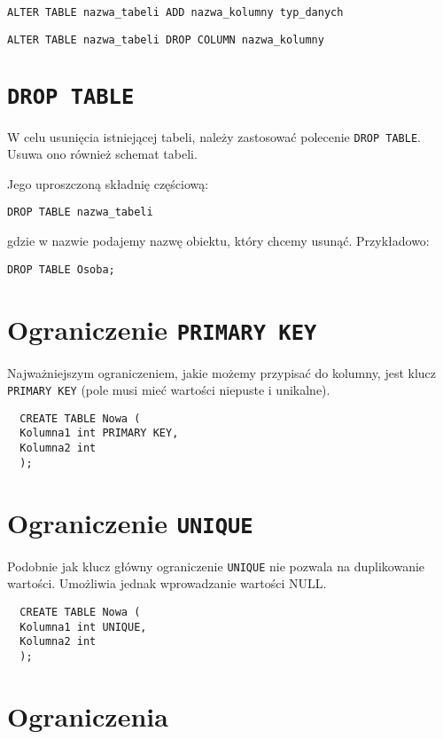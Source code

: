 \documentclass{article}
\begin{document}
\begin{verbatim}
ALTER TABLE nazwa_tabeli ADD nazwa_kolumny typ_danych
\end{verbatim}

\begin{verbatim}
ALTER TABLE nazwa_tabeli DROP COLUMN nazwa_kolumny
\end{verbatim}

\section{\tt DROP TABLE}

W celu usunięcia istniejącej tabeli, należy zastosować polecenie {\tt DROP TABLE}. Usuwa ono również schemat tabeli.

Jego uproszczoną składnię częściową:
\begin{verbatim}
DROP TABLE nazwa_tabeli
\end{verbatim}
gdzie w nazwie podajemy nazwę obiektu, który chcemy usunąć. Przykładowo:
\begin{verbatim}
DROP TABLE Osoba;
\end{verbatim}

\section{Ograniczenie {\tt PRIMARY KEY}}

Najważniejszym ograniczeniem, jakie możemy przypisać do kolumny, jest klucz {\tt PRIMARY KEY} (pole musi mieć wartości niepuste i unikalne).

\begin{verbatim}
  CREATE TABLE Nowa (
  Kolumna1 int PRIMARY KEY,
  Kolumna2 int
  );
\end{verbatim}

\section{Ograniczenie {\tt UNIQUE}}

Podobnie jak klucz główny ograniczenie {\tt UNIQUE} nie pozwala na duplikowanie wartości. Umożliwia jednak wprowadzanie wartości NULL.\@

\begin{verbatim}
  CREATE TABLE Nowa (
  Kolumna1 int UNIQUE,
  Kolumna2 int
  );
\end{verbatim}

\section{Ograniczenia}
\end{document}
